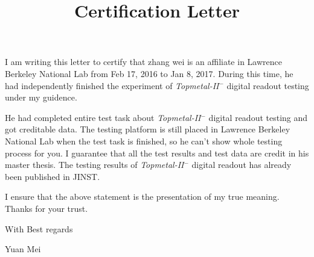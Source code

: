 \documentclass[20pt]{article}
\title{\Huge \textbf{Certification Letter}}
\date{}
\begin{document}
\begin{spacing}{1.25}   
\maketitle
\LARGE \setlength\parindent{2em} I am writing this letter to certify that zhang wei is an affiliate in Lawrence Berkeley National Lab from Feb 17, 2016 to Jan 8, 2017. During this time, he had independently finished the experiment of \emph{Topmetal-II$^-$} digital readout testing under my guidence. 

\LARGE He had completed entire test task about \emph{Topmetal-II$^-$} digital readout testing and got creditable data.  The testing platform is still placed in Lawrence Berkeley National Lab when the test task is finished, so he can't show whole testing process for you. I guarantee that all the test results and test data are credit in his master thesis. The testing results of \emph{Topmetal-II$^-$} digital readout has already been published in JINST.

\LARGE I ensure that the above statement is the presentation of my true meaning. Thanks for your trust.

\setlength\parskip{\baselineskip}
\noindent With Best regards

\noindent Yuan Mei  
\end{spacing}
\end{document}
